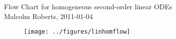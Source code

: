 \documentclass[12pt]{article}
\begin{document}
\pagestyle{empty}


\begin{center}
{\large  Flow Chart for homogeneous second-order linear ODEs}
\\
\vspace{0.3cm}
{\small Malcolm Roberts, 2011-01-04}
\end{center}
\vspace{1cm}


\begin{figure}[h]
  \centering
  \texttt{[image: ../figures/linhomflow]}
\end{figure}

 
\end{document}
